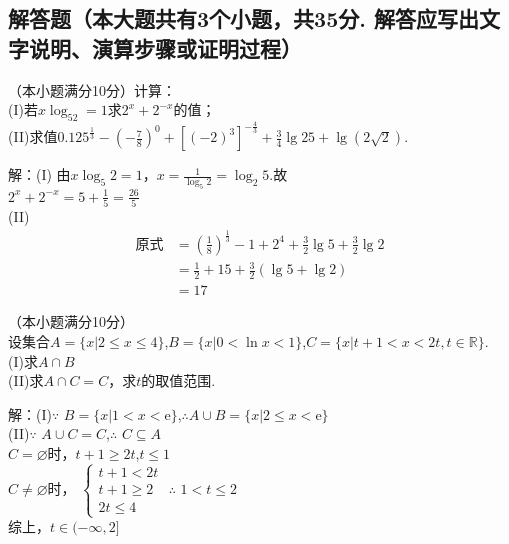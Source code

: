 \begin{exercise}
\section{解答题（本大题共有3个小题，共35分. 解答应写出文字说明、演算步骤或证明过程）}
  \item
    （本小题满分10分）计算：\\
    (I)若$x\log_52=1$求$2^x+2^{-x}$的值；\\
    (II)求值$0.125^{\frac{1}3}-(-\frac78)^0+[(-2)^3]^{-\frac43}+\frac{3}4\lg 25+\lg(2\sqrt2)$.\\
    \begin{answer}
      解：(I) 由$x\log_5 2=1$，$x=\frac{1}{\log_5 2}=\log_2 5$.故\\
      $2^x+2^{-x}=5+\frac15=\frac{26}5$\\
      (II)
      \begin{equation*}
        \begin{align}
          \text{原式}
          &=(\frac18)^{\frac13}-1+2^4+\frac32\lg{5}+\frac32\lg2\\
          &=\frac12+15+\frac32(\lg5+\lg2)\\
          &=17
        \end{align}
      \end{equation*}
    \end{answer}
    \vspace{3cm}
  \item
    （本小题满分10分）\\
    设集合$A=\{x|2\leq x\leq4\}$,$B=\{x|0<\ln x<1\}$,$C=\{x|t+1<x<2t,t\in\mathbb{R}\}$.\\
    (I)求$A\cap B$\\
    (II)求$A\cap C=C$，求$t$的取值范围.\\
    \begin{answer}
    解：(I)$\because$ $B=\{x|1<x<\mathrm{e}\}$,$\therefore$$A\cup B=\{x|2\leq x<\mathrm{e}\}$\\
    (II)$\because$ $A\cup C=C$,$\therefore$ $C\subseteq A$\\
    $C=\varnothing$时，$t+1\geq 2t$,$t\leq 1$\\
    $C\neq\varnothing$时，
    $\begin{cases}
      t+1<2t\\
      t+1\geq 2\\
      2t\leq 4
    \end{cases}
    $
    $\therefore$ $1<t\leq 2$\\
    综上，$t\in (-\infty,2]$
    \end{answer}

\end{exercise}
